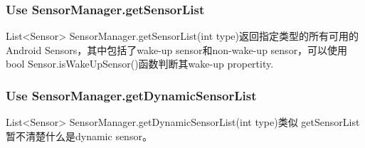 \subsubsection{Use SensorManager.getSensorList}
List<Sensor> SensorManager.getSensorList(int type)返回指定类型的所有可用的
Android Sensors，其中包括了wake-up sensor和non-wake-up sensor，可以使用
bool Sensor.isWakeUpSensor()函数判断其wake-up propertity.

\subsubsection{Use SensorManager.getDynamicSensorList}
List<Sensor> SensorManager.getDynamicSensorList(int type)类似
getSensorList暂不清楚什么是dynamic sensor。

